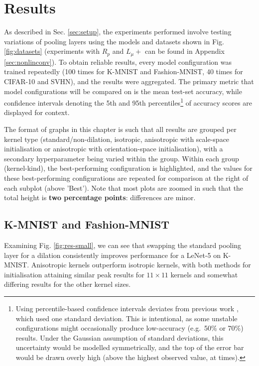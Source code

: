 \documentclass[a4paper, 12pt]{report}
\begin{document}
\chapter{Results}
\label{sec:results}
As described in Sec. \ref{sec:setup}, the experiments performed involve testing variations of pooling layers using the models and datasets shown in Fig. \ref{fig:datasets} (experiments with $R_p$ and $L_\mu+$ can be found in Appendix \ref{sec:nonlinconv}).
To obtain reliable results, every model configuration was trained repeatedly (100 times for K-MNIST and Fashion-MNIST, 40 times for CIFAR-10 and SVHN), and the results were aggregated. The primary metric that model configurations will be compared on is the mean test-set accuracy, while confidence intervals denoting the 5th and 95th percentiles\footnote{Using percentile-based confidence intervals deviates from previous work \cite{thierrybsc, koenbsc}, which used one standard deviation. This is intentional, as some unstable configurations might occasionally produce low-accuracy (e.g.\ 50\% or 70\%) results. Under the Gaussian assumption of standard deviations, this uncertainty would be modelled symmetrically, and the top of the error bar would be drawn overly high (above the highest observed value, at times).} of accuracy scores are displayed for context.

The format of graphs in this chapter is such that all results are grouped per kernel type (standard/non-dilation, isotropic, anisotropic with scale-space initialisation or anisotropic with orientation-space initialisation), with a secondary hyperparameter being varied within the group. Within each group (kernel-kind), the best-performing configuration is highlighted, and the values for these best-performing configurations are repeated for comparison at the right of each subplot (above 'Best'). Note that most plots are zoomed in such that the total height is \textbf{two percentage points}: differences are minor.

\section{K-MNIST and Fashion-MNIST}
Examining Fig. \ref{fig:res-small}, we can see that swapping the standard pooling layer for a dilation consistently improves performance for a LeNet-5 on K-MNIST. Anisotropic kernels outperform isotropic kernels, with both methods for initialisation attaining similar peak results for $11\times11$ kernels and somewhat differing results for the other kernel sizes.
\end{document}
